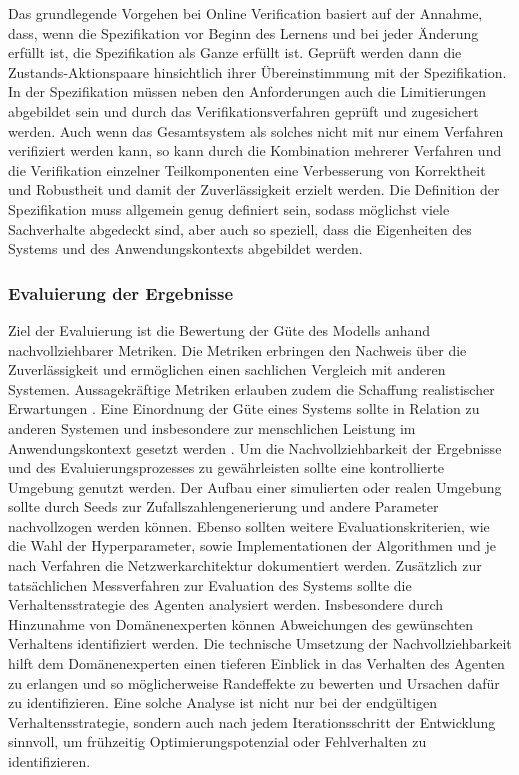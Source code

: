 Das grundlegende Vorgehen bei Online Verification basiert auf der Annahme, dass, wenn die Spezifikation vor Beginn des Lernens und bei jeder Änderung erfüllt ist, die Spezifikation als Ganze erfüllt ist.
Geprüft werden dann die Zustands-Aktionspaare hinsichtlich ihrer Übereinstimmung mit der Spezifikation.
In der Spezifikation müssen neben den Anforderungen auch die Limitierungen abgebildet sein und durch das Verifikationsverfahren geprüft und zugesichert werden.
\ab 
Auch wenn das Gesamtsystem als solches nicht mit nur einem Verfahren verifiziert werden kann, so kann durch die Kombination mehrerer Verfahren und die Verifikation einzelner Teilkomponenten eine Verbesserung von Korrektheit und Robustheit und damit der Zuverlässigkeit erzielt werden.
Die Definition der Spezifikation muss allgemein genug definiert sein, sodass möglichst viele Sachverhalte abgedeckt sind, aber auch so speziell, dass die Eigenheiten des Systems und des Anwendungskontexts abgebildet werden.

\subsubsection{Evaluierung der Ergebnisse}
Ziel der Evaluierung ist die Bewertung der Güte des Modells anhand nachvollziehbarer Metriken.
Die Metriken erbringen den Nachweis über die Zuverlässigkeit und ermöglichen einen sachlichen Vergleich mit anderen Systemen.
Aussagekräftige Metriken erlauben zudem die Schaffung realistischer Erwartungen \cite[S. 13]{gottesman2018}.
Eine Einordnung der Güte eines Systems sollte in Relation zu anderen Systemen und insbesondere zur menschlichen Leistung im Anwendungskontext gesetzt werden \cite{deswarte2019}.
Um die Nachvollziehbarkeit der Ergebnisse und des Evaluierungsprozesses zu gewährleisten sollte eine kontrollierte Umgebung genutzt werden.
Der Aufbau einer simulierten oder realen Umgebung sollte durch Seeds zur Zufallszahlengenerierung und andere Parameter nachvollzogen werden können.
Ebenso sollten weitere Evaluationskriterien, wie die Wahl der Hyperparameter, sowie Implementationen der Algorithmen und je nach Verfahren die Netzwerkarchitektur dokumentiert werden.
\ab 
Zusätzlich zur tatsächlichen Messverfahren zur Evaluation des Systems sollte die Verhaltensstrategie des Agenten \cite[S. 13 f]{gottesman2018} analysiert werden.
Insbesondere durch Hinzunahme von Domänenexperten können Abweichungen des gewünschten Verhaltens identifiziert werden.
Die technische Umsetzung der Nachvollziehbarkeit hilft dem Domänenexperten einen tieferen Einblick in das Verhalten des Agenten zu erlangen und so möglicherweise Randeffekte zu bewerten und Ursachen dafür zu identifizieren.
Eine solche Analyse ist nicht nur bei der endgültigen Verhaltensstrategie, sondern auch nach jedem Iterationsschritt der Entwicklung sinnvoll, um frühzeitig Optimierungspotenzial oder Fehlverhalten zu identifizieren.